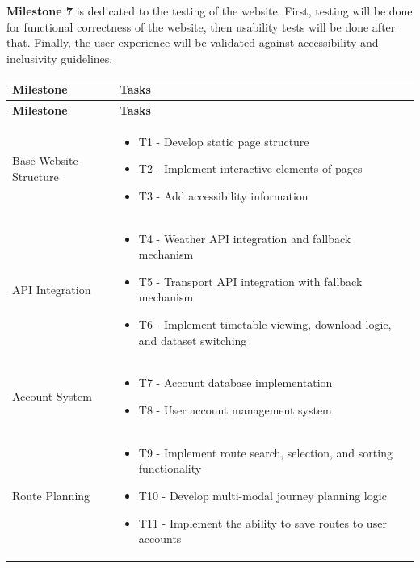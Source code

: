 \documentclass{article}
\begin{document}
\textbf{Milestone 7} is dedicated to the testing of the website. First, testing will be done for functional correctness of the website, then usability tests will be done after that. Finally, the user experience will be validated against accessibility and inclusivity guidelines. \\

\begin{longtable}{|p{4cm}|p{13cm}|}
\hline
\textbf{Milestone} & \textbf{Tasks} \\
\hline
\endfirsthead

\hline
\textbf{Milestone} & \textbf{Tasks} \\
\hline
\endhead

Base Website Structure 
& 
\vspace{-\topsep}
\begin{itemize}[itemsep=2pt, topsep=0pt, parsep=0pt]
    \item T1 - Develop static page structure
    \item T2 - Implement interactive elements of pages
    \item T3 - Add accessibility information
\end{itemize} \\
\hline

API Integration
& 
\vspace{-\topsep}
\begin{itemize}[itemsep=2pt, topsep=0pt, parsep=0pt]
    \item T4 - Weather API integration and fallback mechanism
    \item T5 - Transport API integration with fallback mechanism
    \item T6 - Implement timetable viewing, download logic, and dataset switching
\end{itemize} \\
\hline

Account System
& 
\vspace{-\topsep}
\begin{itemize}[itemsep=2pt, topsep=0pt, parsep=0pt]
    \item T7 - Account database implementation
    \item T8 - User account management system
\end{itemize} \\
\hline

Route Planning 
& 
\vspace{-\topsep}
\begin{itemize}[itemsep=2pt, topsep=0pt, parsep=0pt]
    \item T9 - Implement route search, selection, and sorting functionality
    \item T10 - Develop multi-modal journey planning logic
    \item T11 - Implement the ability to save routes to user accounts
\end{itemize} \\
\hline


\end{longtable}
\end{document}
